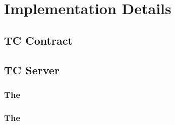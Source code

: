 \section{\tc Implementation Details}


\subsection{TC Contract}
\subsection{TC Server}
\subsubsection{The \medname}
\subsubsection{The \encname}

